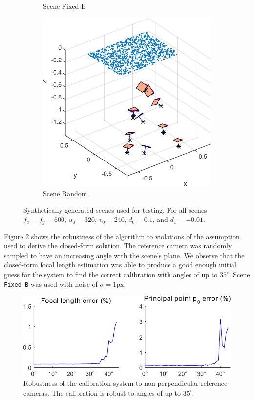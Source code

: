 \documentclass[10pt,twocolumn,letterpaper]{article}
\begin{document}
\begin{figure}
\begin{subfigure}[b]{0.32\linewidth}
	\caption{Scene Fixed-B}
\end{subfigure}
\begin{subfigure}[b]{0.32\linewidth}
\includegraphics[width=\linewidth]{images/synthCameraPosesRandom.pdf}
	\caption{Scene Random}
\end{subfigure}
\caption{Synthetically generated scenes used for testing. For all scenes $f_x=f_y=600$, $u_0=320$, $v_0=240$, $d_0=0.1$, and $d_1=-0.01$.}
\label{fig:synth_poses}
\end{figure}

Figure \ref{fig:results_normal_angle} shows the robustness of the algorithm to violations of the assumption used to derive the closed-form solution. The reference camera was randomly sampled to have an increasing angle with the scene's plane. We observe that the closed-form focal length estimation was able to produce a good enough initial guess for the system to find the correct calibration with angles of up to $35^\circ$.  Scene \texttt{Fixed-B} was used with noise of $\sigma=1\text{px}$.

\begin{figure}
\centering
\includegraphics[width=0.7\linewidth]{images/resultsNormalAngle.pdf}
\caption{Robustness of the calibration system to non-perpendicular reference cameras. The calibration is robust to angles of up to $35^\circ$.}
\label{fig:results_normal_angle}
\end{figure}
\end{document}
